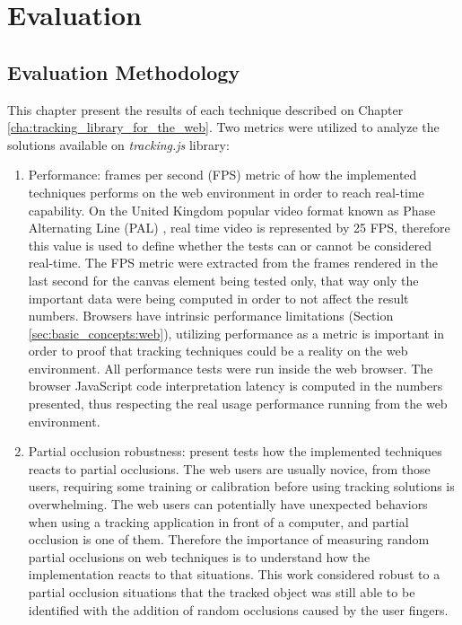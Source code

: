 \chapter{Evaluation} %
\label{cha:evaluation}

\section{Evaluation Methodology} %
\label{sec:evaluation:evaluation_methodology}

This chapter present the results of each technique described on Chapter \ref{cha:tracking_library_for_the_web}. Two metrics were utilized to analyze the solutions available on \textit{tracking.js} library:

\begin{enumerate}
	\item Performance: frames per second (FPS) metric of how the implemented techniques performs on the web environment in order to reach real-time capability. On the United Kingdom popular video format known as Phase Alternating Line (PAL) \cite{PAL1962}, real time video is represented by 25 FPS, therefore this value is used to define whether the tests can or cannot be considered real-time. The FPS metric were extracted from the frames rendered in the last second for the canvas element being tested only, that way only the important data were being computed in order to not affect the result numbers. Browsers have intrinsic performance limitations (Section \ref{sec:basic_concepts:web}), utilizing performance as a metric is important in order to proof that tracking techniques could be a reality on the web environment. All performance tests were run inside the web browser. The browser JavaScript code interpretation latency is computed in the numbers presented, thus respecting the real usage performance running from the web environment.
	\item Partial occlusion robustness: present tests how the implemented techniques reacts to partial occlusions. The web users are usually novice, from those users, requiring some training or calibration before using tracking solutions is overwhelming. The web users can potentially have unexpected behaviors when using a tracking application in front of a computer, and partial occlusion is one of them. Therefore the importance of measuring random partial occlusions on web techniques is to understand how the implementation reacts to that situations. This work considered robust to a partial occlusion situations that the tracked object was still able to be identified with the addition of random occlusions caused by the user fingers.
\end{enumerate}

